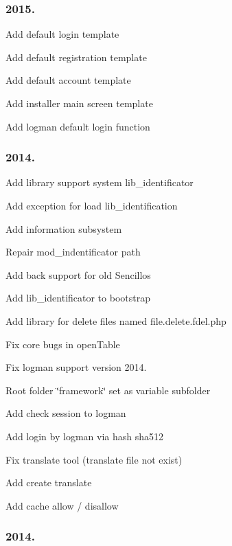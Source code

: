 \subsubsection*{2015.}


\begin{DoxyEnumerate}
\item Add default login template
\item Add default registration template
\item Add default account template
\item Add installer main screen template
\item Add logman default login function
\end{DoxyEnumerate}

\subsubsection*{2014.}


\begin{DoxyEnumerate}
\item Add library support system lib\-\_\-identificator
\item Add exception for load lib\-\_\-identification
\item Add information subsystem
\item Repair mod\-\_\-indentificator path
\item Add back support for old Sencillos
\item Add lib\-\_\-identificator to bootstrap
\item Add library for delete files named file.\-delete.\-fdel.\-php
\item Fix core bugs in open\-Table
\item Fix logman support version 2014.
\item Root folder \char`\"{}framework\char`\"{} set as variable subfolder
\item Add check session to logman
\item Add login by logman via hash sha512
\item Fix translate tool (translate file not exist)
\item Add create translate
\item Add cache allow / disallow
\end{DoxyEnumerate}

\subsubsection*{2014.}


